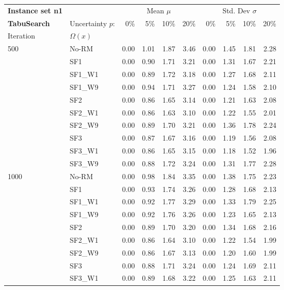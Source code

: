 {\footnotesize
\begin{longtable}{ll|rrrr|rrrr}
\toprule
\textbf{Instance set n1}                 & {} & \multicolumn{4}{c|}{Mean $\mu$} & \multicolumn{4}{c}{Std. Dev $\sigma$} \\
\textbf{TabuSearch}                 & Uncertainty $p$: & 0\% & 5\% & 10\% & 20\% & 0\% & 5\% & 10\% & 20\% \\
Iteration & $\Omega(x)$ &      &      &      &      &      &      &      &      \\
\midrule
500  & No-RM & 0.00 & 1.01 & 1.87 & 3.46 & 0.00 & 1.45 & 1.81 & 2.28 \\
     & SF1 & 0.00 & 0.90 & 1.71 & 3.21 & 0.00 & 1.31 & 1.67 & 2.21 \\
     & SF1\_W1 & 0.00 & 0.89 & 1.72 & 3.18 & 0.00 & 1.27 & 1.68 & 2.11 \\
     & SF1\_W9 & 0.00 & 0.94 & 1.71 & 3.27 & 0.00 & 1.24 & 1.58 & 2.10 \\
     & SF2 & 0.00 & 0.86 & 1.65 & 3.14 & 0.00 & 1.21 & 1.63 & 2.08 \\
     & SF2\_W1 & 0.00 & 0.86 & 1.63 & 3.10 & 0.00 & 1.22 & 1.55 & 2.01 \\
     & SF2\_W9 & 0.00 & 0.89 & 1.70 & 3.21 & 0.00 & 1.36 & 1.78 & 2.24 \\
     & SF3 & 0.00 & 0.87 & 1.67 & 3.16 & 0.00 & 1.19 & 1.56 & 2.08 \\
     & SF3\_W1 & 0.00 & 0.86 & 1.65 & 3.15 & 0.00 & 1.18 & 1.52 & 1.96 \\
     & SF3\_W9 & 0.00 & 0.88 & 1.72 & 3.24 & 0.00 & 1.31 & 1.77 & 2.28 \\ \hline
1000 & No-RM & 0.00 & 0.98 & 1.84 & 3.35 & 0.00 & 1.38 & 1.75 & 2.23 \\
     & SF1 & 0.00 & 0.93 & 1.74 & 3.26 & 0.00 & 1.28 & 1.68 & 2.13 \\
     & SF1\_W1 & 0.00 & 0.92 & 1.77 & 3.29 & 0.00 & 1.33 & 1.79 & 2.25 \\
     & SF1\_W9 & 0.00 & 0.92 & 1.76 & 3.26 & 0.00 & 1.23 & 1.65 & 2.13 \\
     & SF2 & 0.00 & 0.89 & 1.70 & 3.20 & 0.00 & 1.34 & 1.68 & 2.16 \\
     & SF2\_W1 & 0.00 & 0.86 & 1.64 & 3.10 & 0.00 & 1.22 & 1.54 & 1.99 \\
     & SF2\_W9 & 0.00 & 0.86 & 1.67 & 3.13 & 0.00 & 1.20 & 1.60 & 1.99 \\
     & SF3 & 0.00 & 0.88 & 1.71 & 3.24 & 0.00 & 1.24 & 1.69 & 2.11 \\
     & SF3\_W1 & 0.00 & 0.89 & 1.68 & 3.22 & 0.00 & 1.25 & 1.63 & 2.11 \\

\end{longtable}}
